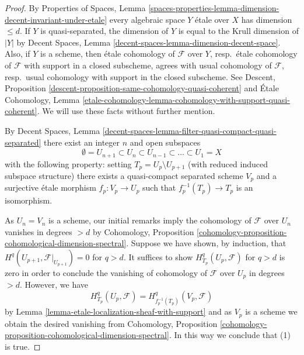 \documentclass{stacks-project}
\theoremstyle{plain}
\theoremstyle{definition}
\theoremstyle{remark}
\numberwithin{equation}{subsection}
\begin{document}
\begin{proof}
By Properties of Spaces, Lemma
\ref{spaces-properties-lemma-dimension-decent-invariant-under-etale}
every algebraic space $Y$ \'etale over $X$ has dimension $\leq d$.
If $Y$ is quasi-separated, the dimension of $Y$ is equal to the
Krull dimension of $|Y|$ by 
Decent Spaces, Lemma \ref{decent-spaces-lemma-dimension-decent-space}.
Also, if $Y$ is a scheme, then \'etale cohomology of $\mathcal{F}$
over $Y$, resp.\ \'etale cohomology of $\mathcal{F}$ with support in a
closed subscheme, agrees with usual cohomology of $\mathcal{F}$,
resp.\ usual cohomology with support in the closed subscheme.
See
Descent, Proposition \ref{descent-proposition-same-cohomology-quasi-coherent}
and
\'Etale Cohomology, Lemma
\ref{etale-cohomology-lemma-cohomology-with-support-quasi-coherent}.
We will use these facts without further mention.

\medskip\noindent
By Decent Spaces, Lemma
\ref{decent-spaces-lemma-filter-quasi-compact-quasi-separated}
there exist an integer $n$ and open subspaces
$$
\emptyset = U_{n + 1} \subset
U_n \subset U_{n - 1} \subset \ldots \subset U_1 = X
$$
with the following property: setting $T_p = U_p \setminus U_{p + 1}$
(with reduced induced subspace structure) there exists a quasi-compact
separated scheme $V_p$ and a surjective \'etale morphism $f_p : V_p \to U_p$
such that $f_p^{-1}(T_p) \to T_p$ is an isomorphism.

\medskip\noindent
As $U_n = V_n$ is a scheme, our initial remarks imply the cohomology of
$\mathcal{F}$ over $U_n$ vanishes in degrees $> d$ by
Cohomology, Proposition
\ref{cohomology-proposition-cohomological-dimension-spectral}.
Suppose we have shown, by induction, that
$H^q(U_{p + 1}, \mathcal{F}|_{U_{p + 1}}) = 0$ for $q > d$.
It suffices to show $H_{T_p}^q(U_p, \mathcal{F})$ for
$q > d$ is zero in order to conclude the vanishing of cohomology
of $\mathcal{F}$ over $U_p$ in degrees $> d$.
However, we have
$$
H^q_{T_p}(U_p, \mathcal{F}) = H^q_{f_p^{-1}(T_p)}(V_p, \mathcal{F})
$$
by Lemma \ref{lemma-etale-localization-sheaf-with-support}
and as $V_p$ is a scheme we obtain the desired vanishing from
Cohomology, Proposition
\ref{cohomology-proposition-cohomological-dimension-spectral}.
In this way we conclude that (1) is true.


\end{proof}
\end{document}
